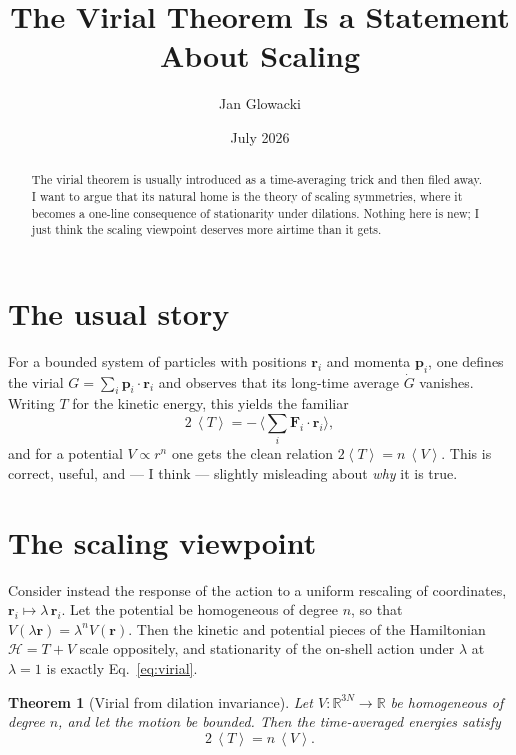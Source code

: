 \documentclass[11pt]{article}
\title{The Virial Theorem Is a Statement About Scaling}
\author{Jan Glowacki}
\date{July 2026}
\newtheorem{theorem}{Theorem}
\theoremstyle{remark}
\newcommand{\ev}[1]{\left\langle #1 \right\rangle}
\newcommand{\R}{\mathbb{R}}
\newcommand{\Ham}{\mathcal{H}}
\begin{document}
\maketitle

\begin{abstract}
The virial theorem is usually introduced as a time-averaging trick and then
filed away. I want to argue that its natural home is the theory of scaling
symmetries, where it becomes a one-line consequence of stationarity under
dilations. Nothing here is new; I just think the scaling viewpoint deserves
more airtime than it gets.
\end{abstract}

\section{The usual story}

For a bounded system of particles with positions $\mathbf{r}_i$ and momenta
$\mathbf{p}_i$, one defines the virial $G = \sum_i \mathbf{p}_i \cdot \mathbf{r}_i$
and observes that its long-time average $\dot{G}$ vanishes. Writing
$T$ for the kinetic energy, this yields the familiar
\begin{equation}
  2\,\ev{T} = -\, \Big\langle \sum_i \mathbf{F}_i \cdot \mathbf{r}_i \Big\rangle ,
  \label{eq:virial}
\end{equation}
and for a potential $V \propto r^{n}$ one gets the clean relation
$2\ev{T} = n\,\ev{V}$. This is correct, useful, and — I think — slightly
misleading about \emph{why} it is true.

\section{The scaling viewpoint}

Consider instead the response of the action to a uniform rescaling of
coordinates, $\mathbf{r}_i \mapsto \lambda\, \mathbf{r}_i$. Let the potential be
homogeneous of degree $n$, so that $V(\lambda \mathbf{r}) = \lambda^{n} V(\mathbf{r})$.
Then the kinetic and potential pieces of the Hamiltonian $\Ham = T + V$
scale oppositely, and stationarity of the on-shell action under $\lambda$
at $\lambda = 1$ is exactly Eq.~\eqref{eq:virial}.

\begin{theorem}[Virial from dilation invariance]
Let $V:\R^{3N}\to\R$ be homogeneous of degree $n$, and let the motion be
bounded. Then the time-averaged energies satisfy
\begin{equation}
  2\,\ev{T} = n\,\ev{V}.
  \label{eq:scaling}
\end{equation}
\end{theorem}
\end{document}
